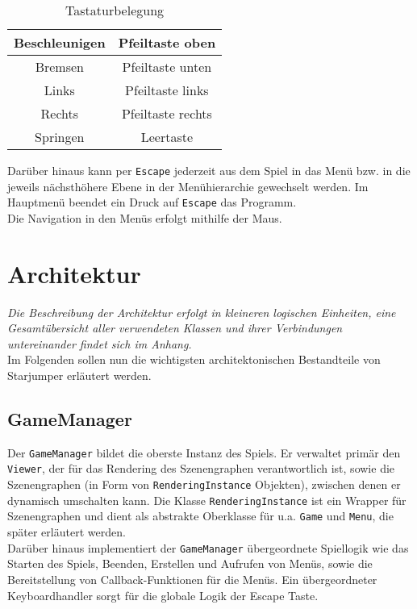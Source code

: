\documentclass{llncs}
\begin{document}
\begin{table}[H]
	\begin{center}
		\begin{tabular}{|c|c|}
			\hline
			Beschleunigen & Pfeiltaste oben \\
			\hline
			Bremsen & Pfeiltaste unten \\
			\hline
			Links & Pfeiltaste links \\
			\hline
			Rechts & Pfeiltaste rechts \\
			\hline
			Springen & Leertaste \\
			\hline
		\end{tabular}
	\end{center}
	\caption{Tastaturbelegung}
\end{table}
\noindent Dar\"uber hinaus kann per \texttt{Escape} jederzeit aus dem Spiel in das Men\"u
bzw. in die jeweils n\"achsth\"ohere Ebene in der Men\"uhierarchie gewechselt werden. Im
Hauptmen\"u beendet ein Druck auf \texttt{Escape} das Programm.\\
Die Navigation in den Men\"us erfolgt mithilfe der Maus.


\section{Architektur}

\textit{Die Beschreibung der Architektur erfolgt in kleineren logischen Einheiten, eine Gesamt\"ubersicht
aller verwendeten Klassen und ihrer Verbindungen untereinander findet sich im Anhang.}\\
Im Folgenden sollen nun die wichtigsten architektonischen Bestandteile von Starjumper
erl\"autert werden. 

\subsection{GameManager}
Der \texttt{GameManager} bildet die oberste Instanz des Spiels. Er verwaltet prim\"ar den \texttt{Viewer}, der f\"ur das
Rendering des Szenengraphen verantwortlich ist, sowie die Szenengraphen (in Form von \texttt{RenderingInstance}
Objekten), zwischen denen er dynamisch umschalten kann. Die Klasse \texttt{RenderingInstance} ist ein
Wrapper f\"ur Szenengraphen und dient als abstrakte Oberklasse f\"ur u.a. \texttt{Game} und \texttt{Menu}, die
sp\"ater erl\"autert werden.\\
Dar\"uber hinaus implementiert der \texttt{GameManager} \"ubergeordnete Spiellogik wie das Starten des Spiels,
Beenden, Erstellen und Aufrufen von Men\"us, sowie die Bereitstellung von Callback-Funktionen f\"ur
die Men\"us. Ein \"ubergeordneter Keyboardhandler sorgt f\"ur die globale Logik der Escape Taste.
\end{document}
